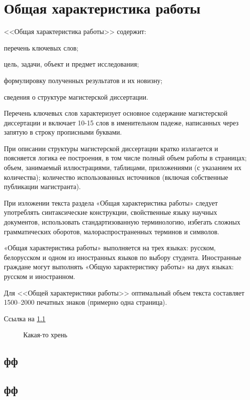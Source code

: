 \chapter{Общая характеристика работы}
<<Общая характеристика работы>> содержит:

перечень ключевых слов;

цель, задачи, объект и предмет исследования;

формулировку полученных результатов и их новизну;

сведения о структуре магистерской диссертации.

Перечень ключевых слов характеризует основное содержание магистерской диссертации и включает 10-15 слов в именительном падеже, написанных через запятую в строку прописными буквами.

При описании структуры магистерской диссертации кратко излагается и поясняется логика ее построения, в том числе полный объем работы в страницах; объем, занимаемый иллюстрациями, таблицами, приложениями (с указанием их количества); количество использованных источников (включая собственные публикации магистранта).

При изложении текста раздела «Общая характеристика работы»
следует употреблять синтаксические конструкции, свойственные языку
научных документов, использовать стандартизованную терминологию,
избегать сложных грамматических оборотов, малораспространенных
терминов и символов.

«Общая характеристика работы» выполняется на трех языках: русском, белорусском и одном из иностранных языков по выбору студента. Иностранные граждане могут выполнять «Общую характеристику работы» на двух языках: русском и иностранном.

Для <<Общей характеристики работы>> оптимальный объем текста составляет 1500--2000 печатных знаков (примерно одна страница).

Ссылка на \cref{fig:1}
\begin{figure}
    \centering
    \caption{Какая-то хрень}\label{fig:1}
\end{figure}

\section{фф}

\section{фф}

